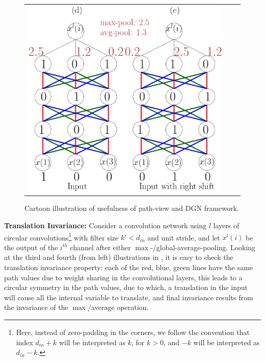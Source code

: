 \begin{figure}
{\begin{tabular}{ccc}
\includegraphics[scale=0.5]{figs/nnconv.png}
\end{tabular}
}
\caption{Cartoon illustration of usefulness of path-view and DGN framework.}
\label{fig:cartoon}
\end{figure}

\textbf{Translation Invariance:} Consider a convolution network using $l$ layers of circular convolutions\footnote{Here, instead of zero-padding in the corners, we follow the convention that index $d_{in}+k$ will be interpreted as $k$, for $k>0$, and $-k$ will be interpreted as $d_{in}-k$.} with filter size $k'<d_{in}$ and unit stride, and let $x^l(i)$ be the output of the $i^{th}$ channel after either $\max$-/global-average-pooling. Looking at the third and fourth (from left) illustrations in , it is easy to check the translation invariance property: each of the red, blue, green lines have the same path values due to weight sharing in the convolutional layers, this leads to a circular symmetry in the path values, due to which, a translation in the input will cause all the internal variable to translate, and final invariance results from the invariance of the $\max$/average operation.

